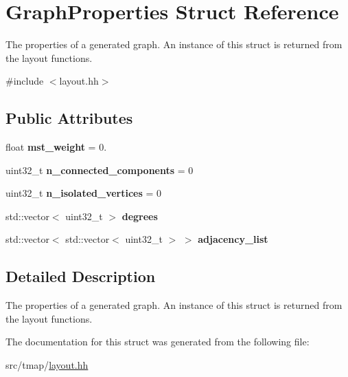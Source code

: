 \hypertarget{structGraphProperties}{}\section{Graph\+Properties Struct Reference}
\label{structGraphProperties}


The properties of a generated graph. An instance of this struct is returned from the layout functions.  




{\ttfamily \#include $<$layout.\+hh$>$}

\subsection*{Public Attributes}
\begin{DoxyCompactItemize}
\item 
\mbox{\label{structGraphProperties_a1924c22c71ea4f60ed7e31db768d5a9b}} 
float {\bfseries mst\+\_\+weight} = 0.
\item 
\mbox{\label{structGraphProperties_a268ebbd3f3ef13fb56e44adfbd2583ca}} 
uint32\+\_\+t {\bfseries n\+\_\+connected\+\_\+components} = 0
\item 
\mbox{\label{structGraphProperties_ad3eec03efec4480e80c5510b896660ae}} 
uint32\+\_\+t {\bfseries n\+\_\+isolated\+\_\+vertices} = 0
\item 
\mbox{\label{structGraphProperties_ae1515b9c7e47a9ed3034bb219871d1c1}} 
std\+::vector$<$ uint32\+\_\+t $>$ {\bfseries degrees}
\item 
\mbox{\label{structGraphProperties_ab567d40199d8d3e6a4a96e8c145df635}} 
std\+::vector$<$ std\+::vector$<$ uint32\+\_\+t $>$ $>$ {\bfseries adjacency\+\_\+list}
\end{DoxyCompactItemize}


\subsection{Detailed Description}
The properties of a generated graph. An instance of this struct is returned from the layout functions. 

The documentation for this struct was generated from the following file\+:\begin{DoxyCompactItemize}
\item 
src/tmap/\hyperlink{layout_8hh}{layout.\+hh}\end{DoxyCompactItemize}
